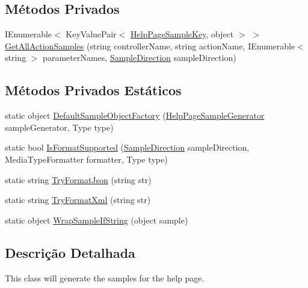 \subsection*{Métodos Privados}
\begin{DoxyCompactItemize}
\item 
I\+Enumerable$<$ Key\+Value\+Pair$<$ \hyperlink{classApi3Layers_1_1Areas_1_1HelpPage_1_1HelpPageSampleKey}{Help\+Page\+Sample\+Key}, object $>$ $>$ \hyperlink{classApi3Layers_1_1Areas_1_1HelpPage_1_1HelpPageSampleGenerator_a5587173d00c977e59fdfa8c9ba660193}{Get\+All\+Action\+Samples} (string controller\+Name, string action\+Name, I\+Enumerable$<$ string $>$ parameter\+Names, \hyperlink{namespaceApi3Layers_1_1Areas_1_1HelpPage_abad9f6d2b059d72558bf70415efc32b5}{Sample\+Direction} sample\+Direction)
\end{DoxyCompactItemize}
\subsection*{Métodos Privados Estáticos}
\begin{DoxyCompactItemize}
\item 
static object \hyperlink{classApi3Layers_1_1Areas_1_1HelpPage_1_1HelpPageSampleGenerator_ad705006e59bbf735bcf96abbf25219f2}{Default\+Sample\+Object\+Factory} (\hyperlink{classApi3Layers_1_1Areas_1_1HelpPage_1_1HelpPageSampleGenerator}{Help\+Page\+Sample\+Generator} sample\+Generator, Type type)
\item 
static bool \hyperlink{classApi3Layers_1_1Areas_1_1HelpPage_1_1HelpPageSampleGenerator_a6c46eac56be8461a66b954a8c0e06dac}{Is\+Format\+Supported} (\hyperlink{namespaceApi3Layers_1_1Areas_1_1HelpPage_abad9f6d2b059d72558bf70415efc32b5}{Sample\+Direction} sample\+Direction, Media\+Type\+Formatter formatter, Type type)
\item 
static string \hyperlink{classApi3Layers_1_1Areas_1_1HelpPage_1_1HelpPageSampleGenerator_a390e739bcbc6d6241fc34bd8588ffd2d}{Try\+Format\+Json} (string str)
\item 
static string \hyperlink{classApi3Layers_1_1Areas_1_1HelpPage_1_1HelpPageSampleGenerator_a0c0c4adce63d443648d6e5618cba3f96}{Try\+Format\+Xml} (string str)
\item 
static object \hyperlink{classApi3Layers_1_1Areas_1_1HelpPage_1_1HelpPageSampleGenerator_a57e4b4a6a99a2c46bd50607776fb92c0}{Wrap\+Sample\+If\+String} (object sample)
\end{DoxyCompactItemize}


\subsection{Descrição Detalhada}
This class will generate the samples for the help page. 



